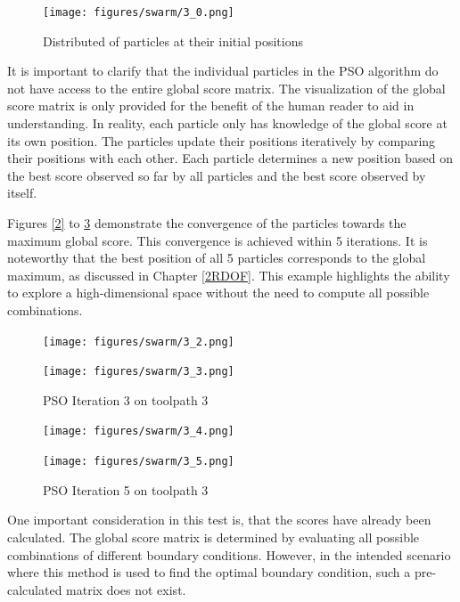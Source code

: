 \begin{figure}[H]
	\centerline{\texttt{[image: figures/swarm/3\_0.png]}}
	\caption{Distributed of particles at their initial positions}
	\label{PSO_1}
\end{figure}



It is important to clarify that the individual particles in the \acrshort{PSO} algorithm do not have access to the entire global score matrix. The visualization of the global score matrix is only provided for the benefit of the human reader to aid in understanding. In reality, each particle only has knowledge of the global score at its own position. The particles update their positions iteratively by comparing their positions with each other. Each particle determines a new position based on the best score observed so far by all particles and the best score observed by itself. 

Figures \ref{2} to \ref{5} demonstrate the convergence of the particles towards the maximum global score. This convergence is achieved within 5 iterations. It is noteworthy that the best position of all 5 particles corresponds to the global maximum, as discussed in Chapter \ref{2RDOF}. This example highlights the ability to explore a high-dimensional space without the need to compute all possible combinations.


\begin{figure}[H]
	\centering
	\begin{minipage}{0.5\textwidth}
		\texttt{[image: figures/swarm/3\_2.png]}
		\caption{PSO Iteration 2 on toolpath 3}
		\label{2}
	\end{minipage}\hfill
	\begin{minipage}{0.5\textwidth}
		\texttt{[image: figures/swarm/3\_3.png]}
		\caption{PSO Iteration 3 on toolpath 3}
		\label{3}
	\end{minipage}\par
\end{figure}	


\begin{figure}[H]	
		\centering
	\begin{minipage}{0.5\textwidth}
		\texttt{[image: figures/swarm/3\_4.png]}
		\caption{PSO Iteration 4 on toolpath 3}
		\label{4}
	\end{minipage}\hfill
	\begin{minipage}{0.5\textwidth}
		\texttt{[image: figures/swarm/3\_5.png]}
		\caption{PSO Iteration 5 on toolpath 3}
		\label{5}
	\end{minipage}\par
\end{figure}
\newpage
One important consideration in this test is, that the scores have already been calculated. The global score matrix is determined by evaluating all possible combinations of different boundary conditions. However, in the intended scenario where this method is used to find the optimal boundary condition, such a pre-calculated matrix does not exist.

